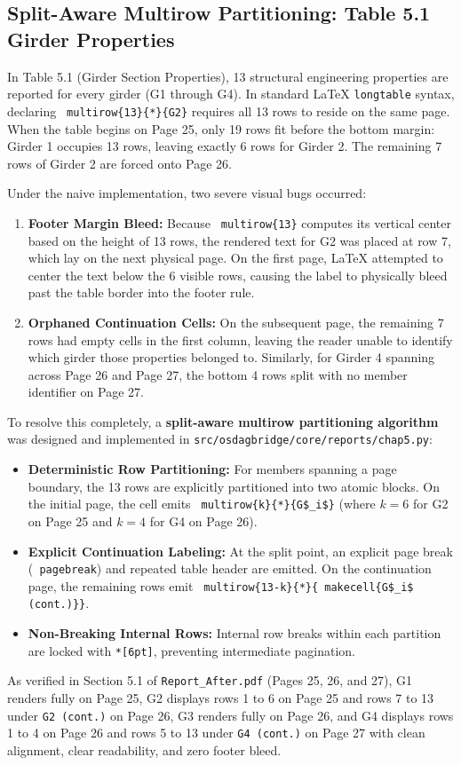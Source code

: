 \documentclass[12pt,a4paper]{article}
\begin{document}
\subsection{Split-Aware Multirow Partitioning: Table 5.1 Girder Properties}
In Table 5.1 (Girder Section Properties), 13 structural engineering properties are reported for every girder (G1 through G4). In standard LaTeX \texttt{longtable} syntax, declaring \texttt{ multirow\{13\}\{*\}\{G2\}} requires all 13 rows to reside on the same page. When the table begins on Page 25, only 19 rows fit before the bottom margin: Girder 1 occupies 13 rows, leaving exactly 6 rows for Girder 2. The remaining 7 rows of Girder 2 are forced onto Page 26.

Under the naive implementation, two severe visual bugs occurred:
\begin{enumerate}
  \item \textbf{Footer Margin Bleed:} Because \texttt{ multirow\{13\}} computes its vertical center based on the height of 13 rows, the rendered text for G2 was placed at row 7, which lay on the next physical page. On the first page, LaTeX attempted to center the text below the 6 visible rows, causing the label to physically bleed past the table border into the footer rule.
  \item \textbf{Orphaned Continuation Cells:} On the subsequent page, the remaining 7 rows had empty cells in the first column, leaving the reader unable to identify which girder those properties belonged to. Similarly, for Girder 4 spanning across Page 26 and Page 27, the bottom 4 rows split with no member identifier on Page 27.
\end{enumerate}

To resolve this completely, a \textbf{split-aware multirow partitioning algorithm} was designed and implemented in \nolinkurl{src/osdagbridge/core/reports/chap5.py}:
\begin{itemize}
  \item \textbf{Deterministic Row Partitioning:} For members spanning a page boundary, the 13 rows are explicitly partitioned into two atomic blocks. On the initial page, the cell emits \texttt{ multirow\{k\}\{*\}\{G\$\_i\$\}} (where $k=6$ for G2 on Page 25 and $k=4$ for G4 on Page 26).
  \item \textbf{Explicit Continuation Labeling:} At the split point, an explicit page break (\texttt{ pagebreak}) and repeated table header are emitted. On the continuation page, the remaining rows emit \texttt{ multirow\{13-k\}\{*\}\{ makecell\{G\$\_i\$ (cont.)\}\}}.
  \item \textbf{Non-Breaking Internal Rows:} Internal row breaks within each partition are locked with \texttt{*[6pt]}, preventing intermediate pagination.
\end{itemize}
As verified in Section 5.1 of \nolinkurl{Report_After.pdf} (Pages 25, 26, and 27), G1 renders fully on Page 25, G2 displays rows 1 to 6 on Page 25 and rows 7 to 13 under \texttt{G2 (cont.)} on Page 26, G3 renders fully on Page 26, and G4 displays rows 1 to 4 on Page 26 and rows 5 to 13 under \texttt{G4 (cont.)} on Page 27 with clean alignment, clear readability, and zero footer bleed.
\end{document}

